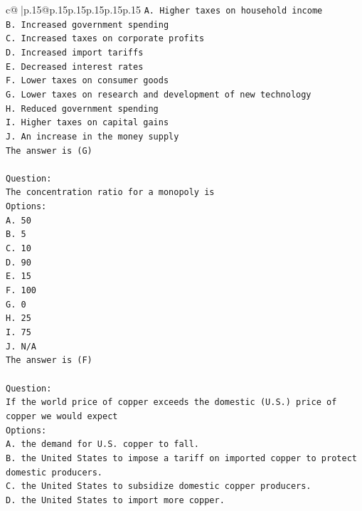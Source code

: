 \documentclass{article}
\begin{document}
{\begin{supertabular}{c@{$\;$}|p{.15\linewidth}@{}p{.15\linewidth}p{.15\linewidth}p{.15\linewidth}p{.15\linewidth}p{.15\linewidth}}
{{{\texttt{A. Higher taxes on household income} \\
\texttt{B. Increased government spending} \\
\texttt{C. Increased taxes on corporate profits} \\
\texttt{D. Increased import tariffs} \\
\texttt{E. Decreased interest rates} \\
\texttt{F. Lower taxes on consumer goods} \\
\texttt{G. Lower taxes on research and development of new technology} \\
\texttt{H. Reduced government spending} \\
\texttt{I. Higher taxes on capital gains} \\
\texttt{J. An increase in the money supply} \\
\texttt{The answer is (G)} \\
\\ 
\texttt{Question:} \\
\texttt{The concentration ratio for a monopoly is} \\
\texttt{Options:} \\
\texttt{A. 50} \\
\texttt{B. 5} \\
\texttt{C. 10} \\
\texttt{D. 90} \\
\texttt{E. 15} \\
\texttt{F. 100} \\
\texttt{G. 0} \\
\texttt{H. 25} \\
\texttt{I. 75} \\
\texttt{J. N/A} \\
\texttt{The answer is (F)} \\
\\ 
\texttt{Question:} \\
\texttt{If the world price of copper exceeds the domestic (U.S.) price of copper we would expect} \\
\texttt{Options:} \\
\texttt{A. the demand for U.S. copper to fall.} \\
\texttt{B. the United States to impose a tariff on imported copper to protect domestic producers.} \\
\texttt{C. the United States to subsidize domestic copper producers.} \\
\texttt{D. the United States to import more copper.} \\
}}}
\end{supertabular}}
\end{document}
